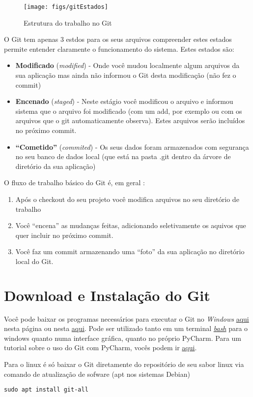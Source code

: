 \documentclass[12pt,a4paper]{article}
\begin{document}
\begin{figure}
	\centering
	\texttt{[image: figs/gitEstados]}
	\caption{Estrutura do trabalho no Git \citep[p. 16]{Chacon2014}}
	\label{fig:gitestados}
\end{figure}


O Git tem apenas 3 estdos para os seus arquivos compreender estes estados permite entender claramente o funcionamento do sistema. Estes estados são:
\begin{itemize}
	\item \textbf{Modificado} (\textit{modified}) - Onde você mudou localmente algum arquivos da sua aplicação mas ainda não informou o Git desta modificação (não fez o commit)
	\item \textbf{Encenado} (\textit{staged}) - Neste estágio você modificou o arquivo e informou sistema que o arquivo foi modificado (com um add, por exemplo ou com os arquivos que o git automaticamente observa). Estes arquivos serão incluídos no próximo commit.
	\item \textbf{``Cometido''} (\textit{commited}) - Os seus dados foram armazenados com segurança no seu banco de dados local (que está na pasta .git  dentro da árvore de diretório da sua aplicação)
\end{itemize}

O fluxo de trabalho básico do Git é, em geral \citep[p.16]{Chacon2014}: 
\begin{enumerate}
	\item Após o checkout do seu projeto você modifica arquivos no seu diretório de trabalho
	\item Você ``encena'' as mudanças feitas, adicionando seletivamente os aquivos que quer incluir no próximo commit.
	\item Você faz um commit armazenando uma ``foto'' da sua aplicação no diretório local do Git.
\end{enumerate}

\section{Download e Instalação do Git} 


Você pode baixar os programas necessários para executar o Git no \textit{Windows} \href{https://gitforwindows.org/}{aqui} nesta página ou nesta \href{https://git-scm.com/download/win}{aqui}. Pode ser utilizado tanto em um terminal \href{https://www.laptopmag.com/articles/use-bash-shell-windows-10}{\textit{bash}}  para o windows quanto numa interface gráfica, quanto no próprio PyCharm. Para um tutorial sobre o uso do Git com PyCharm, vocês podem ir \href{https://blog.softhints.com/pycharm-version-control-and-git-complete-tutorial/}{aqui}.

Para o linux é só baixar o Git diretamente do repositório de seu sabor linux via comando de atualização de sofware (apt nos sistemas Debian)

\begin{verbatim}
sudo apt install git-all
\end{verbatim}



\end{document}
